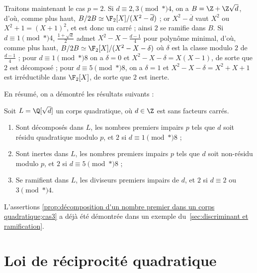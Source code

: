 \documentclass[11pt, useosf,
  title in boldface,
  theorem in new line,
  theorem numbering = section,
  number theorems separately,
]{simplivre}
\begin{document}
    Traitons maintenant le cas \( p = 2 \). Si \( d \equiv 2, 3 \pmod*{4} \), on a \( B = \Z + \Z \sqrt{d} \), d'où, comme plus haut, \( B/2B \simeq \F_2[X]/(X^2-\overline{d}) \) ; or \( X^2 - \overline{d} \) vaut \( X^2 \) ou \( X^2 + 1 = (X+1)^2 \), et est donc un carré ; ainsi \( 2 \) se ramifie dans \( B \). Si \( d \equiv 1 \pmod*{4} \), \( \frac{1+\sqrt{d}}{2} \) admet \( X^2-X-\frac{d-1}{4} \) pour polynôme minimal, d'où, comme plus haut, \( B/2B \simeq \F_2[X]/(X^2-X-\delta) \) où \( \delta \) est la classe modulo \( 2 \) de \( \frac{d-1}{4} \) ; pour \( d \equiv 1 \pmod*{8} \) on a \( \delta = 0 \) et \( X^2-X-\delta = X(X-1) \), de sorte que \( 2 \) est décomposé ; pour \( d \equiv 5 \pmod*{8} \), on a \( \delta = 1 \) et \( X^2-X-\delta = X^2+X+1 \) est irréductible dans \( \F_2[X] \), de sorte que \( 2 \) est inerte.

\enlargethispage*{\baselineskip}
    En résumé, on a démontré les résultats suivants :
    \begin{proposition}\label{prop:décomposition d'un nombre premier dans un corps quadratique}
        Soit \( L = \Q[\sqrt{d}] \) un corps quadratique, où \( d \in \Z \) est sans facteurs carrés.
        \begin{enumerate}
            \item \label{prop:décomposition d'un nombre premier dans un corps quadratique;cas1} Sont décomposés dans \( L \), les nombres premiers impairs \( p \) tels que \( d \) soit résidu quadratique modulo \( p \), et \( 2 \) si \( d \equiv 1 \pmod*{8} \) ;
            \item \label{prop:décomposition d'un nombre premier dans un corps quadratique;cas2} Sont inertes dans \( L \), les nombres premiers impairs \( p \) tels que \( d \) soit non-résidu modulo \( p \), et \( 2 \) si \( d \equiv 5 \pmod*{8} \) ;
            \item \label{prop:décomposition d'un nombre premier dans un corps quadratique;cas3} Se ramifient dans \( L \), les diviseurs premiers impairs de \( d \), et \( 2 \) si \( d \equiv 2 \) ou \( 3 \pmod*{4} \).
        \end{enumerate}
    \end{proposition}
    L'assertions \ref{prop:décomposition d'un nombre premier dans un corps quadratique;cas3} a déjà été démontrée dans un exemple du~\cref{sec:discriminant et ramification}.

\section{Loi de réciprocité quadratique}\label{sec:réciprocité quadratique}
\end{document}
